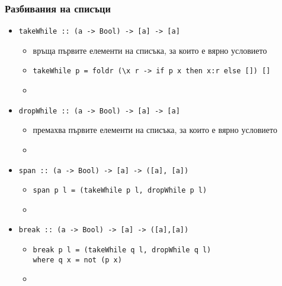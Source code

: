\documentclass{beamer}
\begin{document}
\begin{frame}
  \frametitle{Разбивания на списъци}
  \begin{itemize}[<+->]
  \item \tt{takeWhile :: (a -> Bool) -> [a] -> [a]}
      \begin{itemize}
      \item връща първите елементи на списъка, за които е вярно условието
      \item \tt{takeWhile p = foldr (\textbackslash x r -> if p x then x:r else []) []}
      \item {}
      \end{itemize}
  \item \tt{dropWhile :: (a -> Bool) -> [a] -> [a]}
      \begin{itemize}
      \item премахва първите елементи на списъка, за които е вярно условието
      \item {}
      \end{itemize}
  \item \tt{span :: (a -> Bool) -> [a] -> ([a], [a])}
    \begin{itemize}
    \item \tt{span p l = (takeWhile p l, dropWhile p l)}
    \item {}
    \end{itemize}
  \item \tt{break :: (a -> Bool) -> [a] -> ([a],[a])}
    \begin{itemize}
    \item \tt{break p l = (takeWhile q l, dropWhile q l)}\\
      \hspace{15ex}\tt{where q x = not (p x)}
    \item {}
    \end{itemize}
  \end{itemize}
\end{frame}
\end{document}
